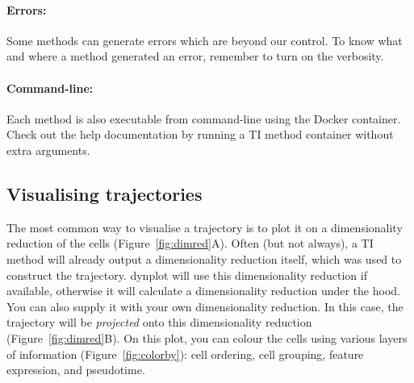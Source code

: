 \paragraph{Errors:} Some methods can generate errors which are beyond our control. To know
what and where a method generated an error, remember to turn on the verbosity.

\paragraph{Command-line:} Each method is also executable from command-line using the Docker container. Check out the help documentation by running a TI method container without extra arguments.




\subsection{Visualising trajectories}

The most common way to visualise a trajectory is to plot it on a
dimensionality reduction of the cells (Figure~\ref{fig:dimred}A).
Often (but not always), a TI
method will already output a dimensionality reduction itself, which was
used to construct the trajectory. {dynplot} will use this
dimensionality reduction if available, otherwise it will calculate a
dimensionality reduction under the hood.
You can also supply it with your own dimensionality reduction. In this
case, the trajectory will be \emph{projected} onto this dimensionality
reduction (Figure~\ref{fig:dimred}B).
On this plot, you can colour the cells using various layers of information (Figure~\ref{fig:colorby}): cell ordering, cell grouping, feature expression, and pseudotime.



